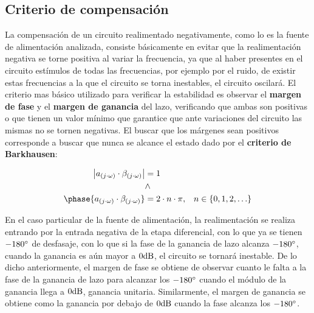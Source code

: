 
\subsection{Criterio de compensación}
\label{sect_margins_explanation}

La compensación de un circuito realimentado negativamente, como lo es la fuente de alimentación analizada, consiste básicamente en evitar que la realimentación negativa se torne positiva al variar la frecuencia, ya que al haber presentes en el circuito estímulos de todas las frecuencias, por ejemplo por el ruido, de existir estas frecuencias a la que el circuito se torna inestables, el circuito oscilará. El criterio mas básico utilizado para verificar la estabilidad es observar el \textbf{margen de fase} y el \textbf{margen de ganancia} del lazo, verificando que ambas son positivas o que tienen un valor mínimo que garantice que ante variaciones del circuito las mismas no se tornen negativas. El buscar que los márgenes sean positivos corresponde a buscar que nunca se alcance el estado dado por el \textbf{criterio de Barkhausen}:

\begin{align}
\begin{split}
\left| a_{(j \cdot \omega)} \cdot \beta_{(j \cdot \omega)} \right| &= 1 \\
& \land \\
\phase{a_{(j \cdot \omega)} \cdot \beta_{(j \cdot \omega)}} &= 2 \cdot n \cdot \pi,\;\;\; n \in \left \{  0, 1, 2, \ldots \right \} 
\end{split} 
\end{align}


En el caso particular de la fuente de alimentación, la realimentación se realiza entrando por la entrada negativa de la etapa diferencial, con lo que ya se tienen $-180 \si[per-mode=symbol]{\degree}$ de desfasaje, con lo que si la fase de la ganancia de lazo alcanza $-180 \si[per-mode=symbol]{\degree}$, cuando la ganancia es aún mayor a $0 \si[per-mode=symbol]{\decibel}$, el circuito se tornará inestable. De lo dicho anteriormente, el margen de fase se obtiene de observar cuanto le falta a la fase de la ganancia de lazo para alcanzar los $-180 \si[per-mode=symbol]{\degree}$  cuando el módulo de la ganancia llega a $0 \si[per-mode=symbol]{\decibel}$, ganancia unitaria. Similarmente, el margen de ganancia se obtiene como la ganancia por debajo de $0 \si[per-mode=symbol]{\decibel}$ cuando la fase alcanza los $-180 \si[per-mode=symbol]{\degree}$.


